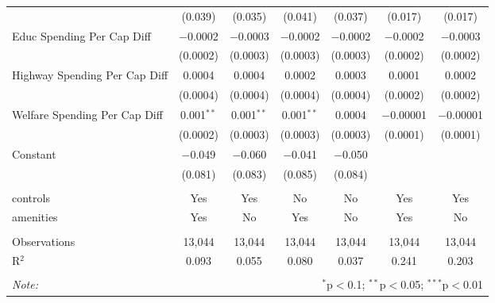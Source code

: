 \begin{table}[!htbp]
\begin{tabular}{@{\extracolsep{5pt}}lcccccc}
  & (0.039) & (0.035) & (0.041) & (0.037) & (0.017) & (0.017) \\ 
  Educ Spending Per Cap Diff & $-$0.0002 & $-$0.0003 & $-$0.0002 & $-$0.0002 & $-$0.0002 & $-$0.0003 \\ 
  & (0.0002) & (0.0003) & (0.0003) & (0.0003) & (0.0002) & (0.0002) \\ 
  Highway Spending Per Cap Diff & 0.0004 & 0.0004 & 0.0002 & 0.0003 & 0.0001 & 0.0002 \\ 
  & (0.0004) & (0.0004) & (0.0004) & (0.0004) & (0.0002) & (0.0002) \\ 
  Welfare Spending Per Cap Diff & 0.001$^{**}$ & 0.001$^{**}$ & 0.001$^{**}$ & 0.0004 & $-$0.00001 & $-$0.00001 \\ 
  & (0.0002) & (0.0003) & (0.0003) & (0.0003) & (0.0001) & (0.0001) \\ 
  Constant & $-$0.049 & $-$0.060 & $-$0.041 & $-$0.050 &  &  \\ 
  & (0.081) & (0.083) & (0.085) & (0.084) &  &  \\ 
 \hline \\[-1.8ex] 
controls & Yes & Yes & No & No & Yes & Yes \\ 
amenities & Yes & No & Yes & No & Yes & No \\ 
\hline \\[-1.8ex] 
Observations & 13,044 & 13,044 & 13,044 & 13,044 & 13,044 & 13,044 \\ 
R$^{2}$ & 0.093 & 0.055 & 0.080 & 0.037 & 0.241 & 0.203 \\ 
\hline 
\hline \\[-1.8ex] 
\textit{Note:}  & \multicolumn{6}{r}{$^{*}$p$<$0.1; $^{**}$p$<$0.05; $^{***}$p$<$0.01} \\ 
\end{tabular} 
\end{table} 
